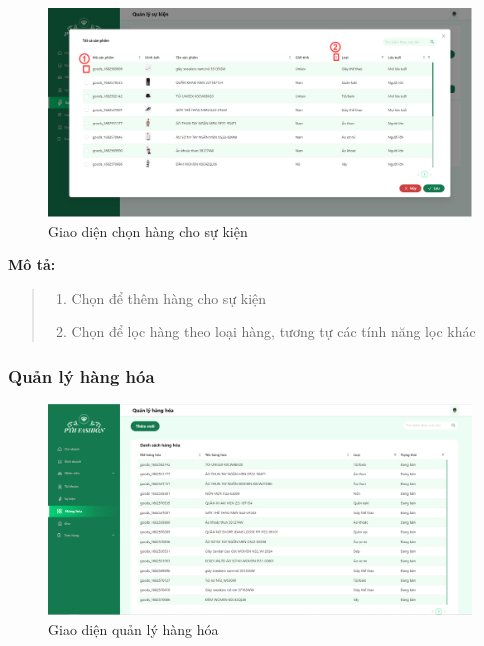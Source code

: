 
\begin{figure}[!htp]
    \centering
    \includegraphics[width=12cm]{img/UI/admin_implement/eventAllGoods.png}
    \newline
    \caption{Giao diện chọn hàng cho sự kiện}
\end{figure}
\textbf{Mô tả:}
\begin{quote}
    \begin{enumerate}
        \item Chọn để thêm hàng cho sự kiện
        \item Chọn để lọc hàng theo loại hàng, tương tự các tính năng lọc khác
    \end{enumerate}
\end{quote}

\newpage
\subsubsection{Quản lý hàng hóa}
\begin{figure}[!htp]
    \centering
    \includegraphics[width=12cm]{img/UI/admin_implement/goods.png}
    \newline
    \caption{Giao diện quản lý hàng hóa}
\end{figure}


